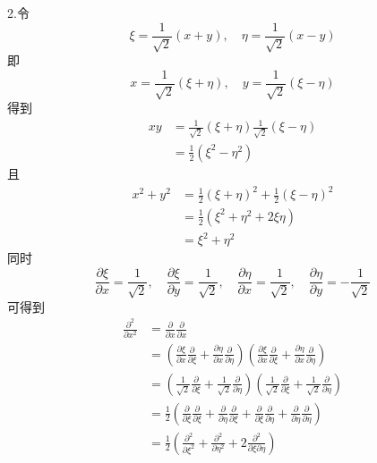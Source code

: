 2.令
\begin{equation}
    \xi =\frac{1}{\sqrt{2}}\left( x+y \right) ,\quad \eta =\frac{1}{\sqrt{2}}\left( x-y \right) 
\end{equation}
即
\begin{equation}
    x=\frac{1}{\sqrt{2}}\left( \xi +\eta \right)  ,\quad y=\frac{1}{\sqrt{2}}\left( \xi -\eta \right) 
\end{equation}
得到
\begin{equation}
    \begin{aligned}
        xy&=\frac{1}{\sqrt{2}}\left( \xi +\eta \right) \frac{1}{\sqrt{2}}\left( \xi -\eta \right) 
\\
&=\frac{1}{2}\left( \xi ^2-\eta ^2 \right) 
    \end{aligned}
\end{equation}
且
\begin{equation}
    \begin{aligned}
        x^2+y^2&=\frac{1}{2}\left( \xi +\eta \right) ^2+\frac{1}{2}\left( \xi -\eta \right) ^2
\\
&=\frac{1}{2}\left( \xi ^2+\eta ^2+2\xi \eta \right) 
\\
&=\xi ^2+\eta ^2
    \end{aligned}
\end{equation}
同时
\begin{equation}
    \frac{\partial \xi}{\partial x}=\frac{1}{\sqrt{2}},\quad \frac{\partial \xi}{\partial y}=\frac{1}{\sqrt{2}},\quad \frac{\partial \eta}{\partial x}=\frac{1}{\sqrt{2}},\quad \frac{\partial \eta}{\partial y}=-\frac{1}{\sqrt{2}}
\end{equation}
可得到
\begin{equation}
    \begin{aligned}
        \frac{\partial ^2}{\partial x^2}&=\frac{\partial}{\partial x}\frac{\partial}{\partial x}
\\
&=\left( \frac{\partial \xi}{\partial x}\frac{\partial}{\partial \xi}+\frac{\partial \eta}{\partial x}\frac{\partial}{\partial \eta} \right) \left( \frac{\partial \xi}{\partial x}\frac{\partial}{\partial \xi}+\frac{\partial \eta}{\partial x}\frac{\partial}{\partial \eta} \right) 
\\
&=\left( \frac{1}{\sqrt{2}}\frac{\partial}{\partial \xi}+\frac{1}{\sqrt{2}}\frac{\partial}{\partial \eta} \right) \left( \frac{1}{\sqrt{2}}\frac{\partial}{\partial \xi}+\frac{1}{\sqrt{2}}\frac{\partial}{\partial \eta} \right) 
\\
&=\frac{1}{2}\left( \frac{\partial}{\partial \xi}\frac{\partial}{\partial \xi}+\frac{\partial}{\partial \eta}\frac{\partial}{\partial \xi}+\frac{\partial}{\partial \xi}\frac{\partial}{\partial \eta}+\frac{\partial}{\partial \eta}\frac{\partial}{\partial \eta} \right) 
\\
&=\frac{1}{2}\left( \frac{\partial ^2}{\partial \xi ^2}+\frac{\partial ^2}{\partial \eta ^2}+2\frac{\partial ^2}{\partial \xi \partial \eta} \right) 
    \end{aligned}
\end{equation}
